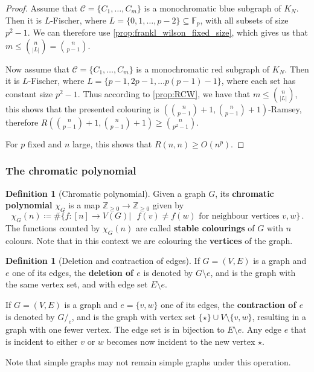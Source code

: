 \documentclass[12pt]{amsart}
\theoremstyle{definition}
\newtheorem{defin}[thm]{Definition}
\newcommand{\Z}{\mathbb{Z}}
\newcommand{\F}{\mathbb{F}}
\newcommand{\CC}{\mathcal C}
\begin{document}
\begin{proof}
Assume that $\CC = \{C_1, \ldots, C_m\}$ is a monochromatic blue subgraph of $K_N$.
Then it is $L$-Fischer, where $L = \{0, 1, \ldots, p-2\} \subseteq \F_p$, with all subsets of size $p^2-1$.
We can therefore use \cref{prop:frankl_wilson_fixed_size}, which gives us that $m \leq \binom{n}{|L|} = \binom{n}{p-1}$.

Now assume that $\CC = \{ C_1, \ldots,  C_m\}$ is a monochromatic red subgraph of $K_N$.
Then it is $L$-Fischer, where $L = \{p-1, 2p-1, \ldots p(p-1) - 1\}$, where each set has constant size $p^2-1$.
Thus according to \cref{prop:RCW}, we have that $m \leq \binom{n}{|L|}$, this shows that the presented colouring is $(\binom{n}{p-1}+1, \binom{n}{p-1}+1)$-Ramsey, therefore $R(\binom{n}{p-1}+1, \binom{n}{p-1}+1) \geq \binom{n}{p^2-1}$.

For $p$ fixed and $n$ large, this shows that $R(n, n) \geq O(n^p)$.
\end{proof}

\subsubsection{The chromatic polynomial}


\begin{defin}[Chromatic polynomial]
Given a graph $G$, its \textbf{chromatic polynomial} $\chi_G$ is a map $\Z_{\geq 0} \to \Z_{\geq 0}$ given by
$$\chi_G(n) \coloneqq \#\{f:[n] \to V(G) | \text{ $f(v) \neq f(w)$ for neighbour vertices $v, w$}\}\, . $$
The functions counted by $\chi_G(n)$ are called \textbf{stable colourings} of $G$ with $n$ colours.
Note that in this context we are colouring the \textbf{vertices} of the graph.
\end{defin}

\begin{defin}[Deletion and contraction of edges]
If $G=(V, E)$ is a graph and $e$ one of its edges, the \textbf{deletion of $e$} is denoted by $G\setminus e$, and is the graph with the same vertex set, and with edge set $E\setminus e$.

If $G=(V, E)$ is a graph and $e=\{v, w\}$ one of its edges, the \textbf{contraction of $e$} is denoted by $G/_e$, and is the graph with vertex set $\{\star\} \cup V \setminus\{v, w\}$, resulting in a graph with one fewer vertex.
The edge set is in bijection to $E\setminus e$.
Any edge $e$ that is incident to either $v$ or $w$ becomes now incident to the new vertex $\star $.

Note that simple graphs may not remain simple graphs under this operation.
\end{defin}
\end{document}
